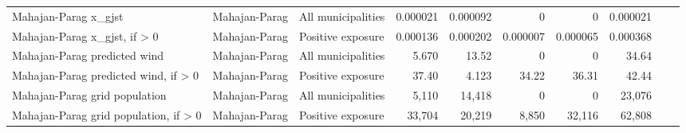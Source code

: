 \begin{minipage}{\linewidth}
{\begin{tabular}{lllrrrrrrr}
Mahajan-Parag x\_gjst & Mahajan-Parag & All municipalities & 0.000021 & 0.000092 & 0 & 0 & 0.000021 &  &  \\
Mahajan-Parag x\_gjst, if > 0 & Mahajan-Parag & Positive exposure & 0.000136 & 0.000202 & 0.000007 & 0.000065 & 0.000368 &  &  \\
Mahajan-Parag predicted wind & Mahajan-Parag & All municipalities & 5.670 & 13.52 & 0 & 0 & 34.64 &  &  \\
Mahajan-Parag predicted wind, if > 0 & Mahajan-Parag & Positive exposure & 37.40 & 4.123 & 34.22 & 36.31 & 42.44 &  &  \\
Mahajan-Parag grid population & Mahajan-Parag & All municipalities & 5,110 & 14,418 & 0 & 0 & 23,076 &  &  \\
Mahajan-Parag grid population, if > 0 & Mahajan-Parag & Positive exposure & 33,704 & 20,219 & 8,850 & 32,116 & 62,808 &  &  \\
\bottomrule
\end{tabular}
}
\end{minipage}
